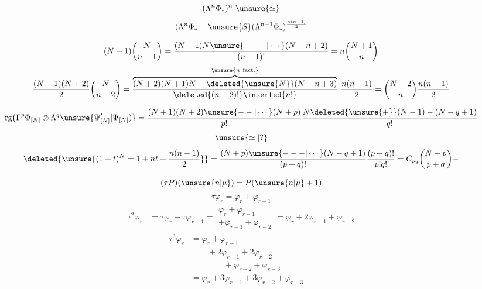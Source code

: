 
\[
(\Lambda^n\Phi_*)^n\ \unsure{\simeq}
\]
\[
(\Lambda^n\Phi_*+\unsure{S}(\Lambda^{n-1}\Phi_*)^{\frac{n(n-1)}2}
\]

\[
(N+1)\binom{N}{n-1}
=\frac{(N+1)N\unsure{---|\cdots}(N-n+2)}{(n-1)!}
=n\binom{N+1}{n}
\]
\[
\frac{(N+1)(N+2)}2\binom{N}{n-2}
=\frac{\overbrace{(N+2)(N+1)N-\deleted{\unsure{N}}(N-n+3)}^{\unsure{n\ \text{fact.}}}}
{\deleted{(n-2)!}\inserted{n!}}\ \frac{n(n-1)}2
=\binom{N+2}{n}\frac{n(n-1)}2
\]

\[
\operatorname{rg}\bigl(\Gamma^p\Phi_{[N]}\otimes\Lambda^q\unsure{\Psi_{[N]}'|\Psi_{[N]})}
=\frac{(N+1)(N+2)\unsure{--|\cdots}(N+p)}{p!}
\frac{N\deleted{\unsure{+}}(N-1)-(N-q+1)}{q!}
\]
\[
\unsure{\simeq|?}
\]
\[
\deleted{\unsure{(1+t)^N=1+nt+\frac{n(n-1)}2}}
=\frac{(N+p)\unsure{---|\cdots}(N-q+1)}{(p+q)!}\frac{(p+q)!}{p!q!}
=C_{pq}\binom{N+p}{p+q}-
\]

\[
(\tau P)(\unsure{n|\mu})=P(\unsure{n|\mu}+1)
\]
\[
\tau\varphi_r=\varphi_r+\varphi_{r-1}
\]
\[
\begin{aligned}
\tau^2\varphi_r&=\tau\varphi_r+\tau\varphi_{r-1}
=\begin{gathered}\varphi_r+\varphi_{r-1}\\+\varphi_{r-1}+\varphi_{r-2}\end{gathered}
=\varphi_r+2\varphi_{r-1}+\varphi_{r-2}
\end{aligned}
\]
\[
\begin{aligned}
\tau^3\varphi_r&=\varphi_r+\varphi_{r-1}\\
&\qquad+2\varphi_{r-1}+2\varphi_{r-2}\\
&\qquad\qquad+\varphi_{r-2}+\varphi_{r-3}\\
&=\varphi_r+3\varphi_{r-1}+3\varphi_{r-2}+\varphi_{r-3}-
\end{aligned}
\]


